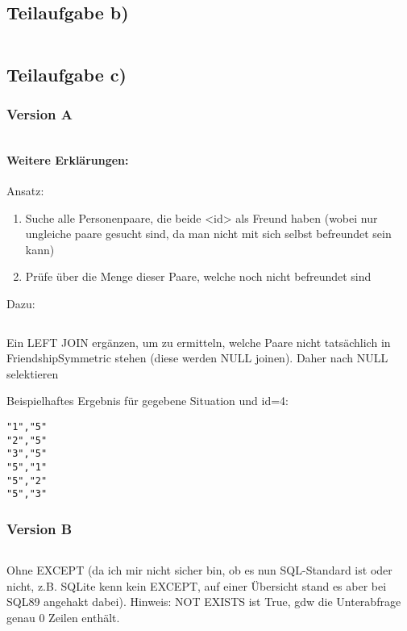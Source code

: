 \documentclass[a4paper,9pt]{scrartcl}
\begin{document}
\subsection{Teilaufgabe b)}
\inputminted[linenos, numbersep=5pt, tabsize=4]{sql}{d2b.sql}

\subsection{Teilaufgabe c)}
\subsubsection{Version A}
\inputminted[linenos, numbersep=5pt, tabsize=4]{sql}{d2c1.sql}

\paragraph{Weitere Erklärungen:}
Ansatz:
\begin{enumerate}
    \item Suche alle Personenpaare, die beide <id> als Freund haben (wobei
   nur ungleiche paare gesucht sind, da man nicht mit sich selbst befreundet
   sein kann)
    \item Prüfe über die Menge dieser Paare, welche noch nicht befreundet sind
\end{enumerate}

Dazu:
\inputminted[linenos, numbersep=5pt, tabsize=4]{sql}{d2c1.2.sql}

Ein LEFT JOIN ergänzen, um zu ermitteln, welche Paare nicht tatsächlich
in FriendshipSymmetric stehen (diese werden NULL joinen). Daher nach NULL
selektieren


Beispielhaftes Ergebnis für gegebene Situation und id=4:
\begin{verbatim}
"1","5"
"2","5"
"3","5"
"5","1"
"5","2"
"5","3"
\end{verbatim}
 
\subsubsection{Version B}
\inputminted[linenos, numbersep=5pt, tabsize=4]{sql}{d2c2.sql}

Ohne EXCEPT (da ich mir nicht sicher bin, ob es nun SQL-Standard
ist oder nicht, z.B. SQLite kenn kein EXCEPT, auf einer Übersicht
stand es aber bei SQL89 angehakt dabei).
Hinweis: NOT EXISTS ist True, gdw die Unterabfrage genau 0
Zeilen enthält.

\inputminted[linenos, numbersep=5pt, tabsize=4]{sql}{d2c2.1.sql}
\end{document}
